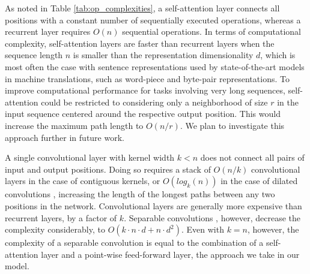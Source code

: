 As noted in Table \ref{tab:op_complexities}, a self-attention layer connects all positions with a constant number of sequentially executed operations, whereas a recurrent layer requires $O(n)$ sequential operations.
In terms of computational complexity, self-attention layers are faster than recurrent layers when the sequence length $n$ is smaller than the representation dimensionality $d$, which is most often the case with sentence representations used by state-of-the-art models in machine translations, such as word-piece \citep{wu2016google} and byte-pair \citep{sennrich2015neural} representations.
To improve computational performance for tasks involving very long sequences, self-attention could be restricted to considering only a neighborhood of size $r$ in the input sequence centered around the respective output position. This would increase the maximum path length to $O(n/r)$. We plan to investigate this approach further in future work.

A single convolutional layer with kernel width $k < n$ does not connect all pairs of input and output positions. Doing so requires a stack of $O(n/k)$ convolutional layers in the case of contiguous kernels, or $O(log_k(n))$ in the case of dilated convolutions \citep{NalBytenet2017}, increasing the length of the longest paths between any two positions in the network.
Convolutional layers are generally more expensive than recurrent layers, by a factor of $k$. Separable convolutions \citep{xception2016}, however, decrease the complexity considerably, to $O(k \cdot n \cdot d + n \cdot d^2)$. Even with $k=n$, however, the complexity of a separable convolution is equal to the combination of a self-attention layer and a point-wise feed-forward layer, the approach we take in our model.




